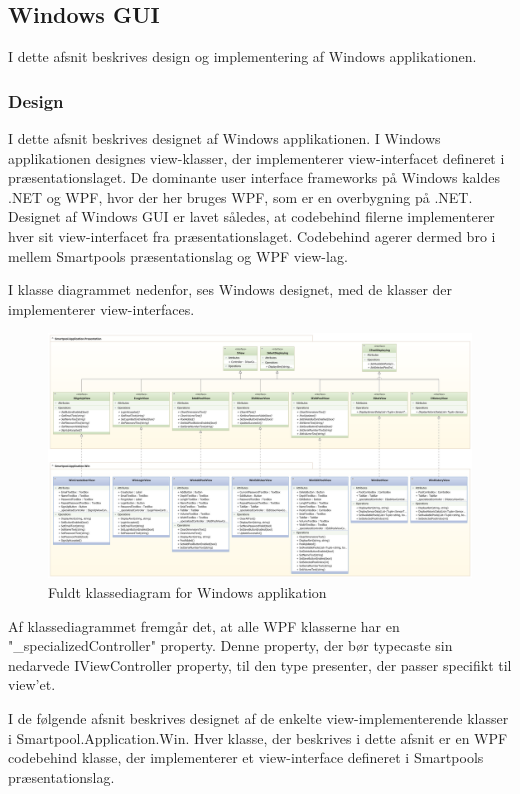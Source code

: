 \subsection{Windows GUI}
I dette afsnit beskrives design og implementering af Windows applikationen.

\subsubsection{Design}
I dette afsnit beskrives designet af Windows applikationen. I Windows applikationen designes view-klasser, der implementerer view-interfacet defineret i præsentationslaget. De dominante user interface frameworks på Windows kaldes .NET og WPF, hvor der her bruges WPF, som er en overbygning på .NET. 
Designet af Windows GUI er lavet således, at codebehind filerne implementerer hver sit view-interfacet fra præsentationslaget.
Codebehind agerer dermed bro i mellem Smartpools præsentationslag og WPF view-lag.

I klasse diagrammet nedenfor, ses Windows designet, med de klasser der implementerer view-interfaces.
\begin{landscape}
\begin{figure}
\centering
\includegraphics[width=1\linewidth]{figs/design/win_uml_full}
\caption{Fuldt klassediagram for Windows applikation}
\label{fig:win_uml_full}
\end{figure}
\end{landscape}

Af klassediagrammet fremgår det, at alle WPF klasserne har en "\_specializedController" property. Denne property, der bør typecaste sin nedarvede IViewController property, til den type presenter, der passer specifikt til view'et.

I de følgende afsnit beskrives designet af de enkelte view-implementerende klasser i Smartpool.Application.Win. Hver klasse, der beskrives i dette afsnit er en WPF codebehind klasse, der implementerer et view-interface defineret i Smartpools præsentationslag.

